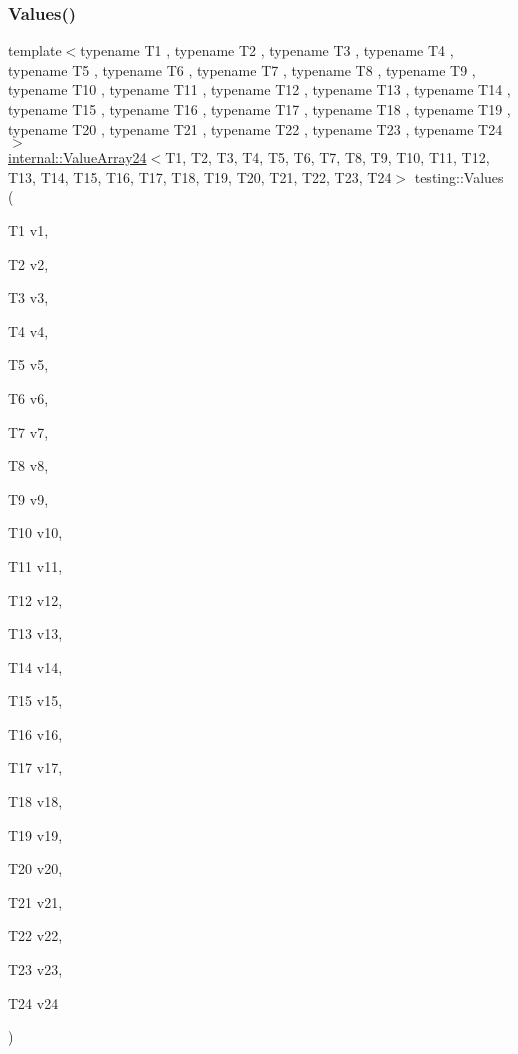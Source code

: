 \subsubsection{\texorpdfstring{Values()}{Values()}\hspace{0.1cm}{\footnotesize\ttfamily [25/51]}}
{\footnotesize\ttfamily template$<$typename T1 , typename T2 , typename T3 , typename T4 , typename T5 , typename T6 , typename T7 , typename T8 , typename T9 , typename T10 , typename T11 , typename T12 , typename T13 , typename T14 , typename T15 , typename T16 , typename T17 , typename T18 , typename T19 , typename T20 , typename T21 , typename T22 , typename T23 , typename T24 $>$ \\
\mbox{\hyperlink{classtesting_1_1internal_1_1_value_array24}{internal\+::\+Value\+Array24}}$<$T1, T2, T3, T4, T5, T6, T7, T8, T9, T10, T11, T12, T13, T14, T15, T16, T17, T18, T19, T20, T21, T22, T23, T24$>$ testing\+::\+Values (\begin{DoxyParamCaption}\item[{T1}]{v1,  }\item[{T2}]{v2,  }\item[{T3}]{v3,  }\item[{T4}]{v4,  }\item[{T5}]{v5,  }\item[{T6}]{v6,  }\item[{T7}]{v7,  }\item[{T8}]{v8,  }\item[{T9}]{v9,  }\item[{T10}]{v10,  }\item[{T11}]{v11,  }\item[{T12}]{v12,  }\item[{T13}]{v13,  }\item[{T14}]{v14,  }\item[{T15}]{v15,  }\item[{T16}]{v16,  }\item[{T17}]{v17,  }\item[{T18}]{v18,  }\item[{T19}]{v19,  }\item[{T20}]{v20,  }\item[{T21}]{v21,  }\item[{T22}]{v22,  }\item[{T23}]{v23,  }\item[{T24}]{v24 }\end{DoxyParamCaption})}

\mbox{\label{namespacetesting_a74baf6524bda9b5799e313541b4816ea}} 
